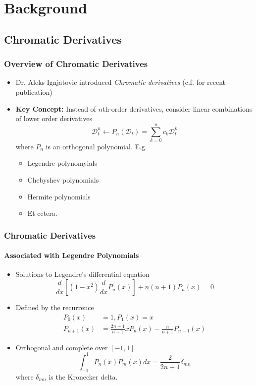 \documentclass{beamer}
\begin{document}
\section{Background}

\subsection{Chromatic Derivatives}

\begin{frame}
\frametitle{Overview of Chromatic Derivatives}
\begin{itemize}
	\item Dr. Aleks Ignjatovic introduced \textit{Chromatic derivatives} 
	(c.f. \cite{Ignjatovic2009} for recent publication)
	\item \textbf{Key Concept:} Instead of $n$th-order derivatives, consider linear 
	combinations of lower order derivatives
	\begin{equation*}
		\mathcal{D}_t^n \leftarrow P_n(\mathcal{D}_t) = \sum_{k=0}^{n} c_k \mathcal{D}_t^k
	\end{equation*}
	where $P_n$ is an \alert{orthogonal polynomial}. E.g.
	\begin{itemize}
		\item Legendre polynomyials
		\item Chebyshev polynomials
		\item Hermite polynomials
		\item Et cetera.
	\end{itemize}
\end{itemize}
\end{frame}


\begin{frame}
\frametitle{Chromatic Derivatives}
\framesubtitle{Associated with Legendre Polynomials}
\begin{itemize}
\item Solutions to Legendre's differential equation
\begin{equation*}
\frac{d}{dx}\left[(1-x^2)\frac{d}{dx}P_n(x)\right]+n(n+1)P_n(x)=0
\end{equation*}
\item Defined by the recurrence
\begin{align*}
P_0(x) &= 1, P_1(x) = x \\
P_{n+1}(x) &= \frac{2n+1}{n+1}xP_n(x) - \frac{n}{n+1}P_{n-1}(x)
\end{align*}
\item \alert{Orthogonal} and \alert{complete} over $[-1, 1]$
\begin{equation*}
\int_{-1}^{1} P_n(x)P_m(x) dx = \frac{2}{2n+1} \delta_{mn}
\end{equation*}
where $\delta_{mn}$ is the Kronecker delta.
\end{itemize}
\end{frame}
\end{document}
